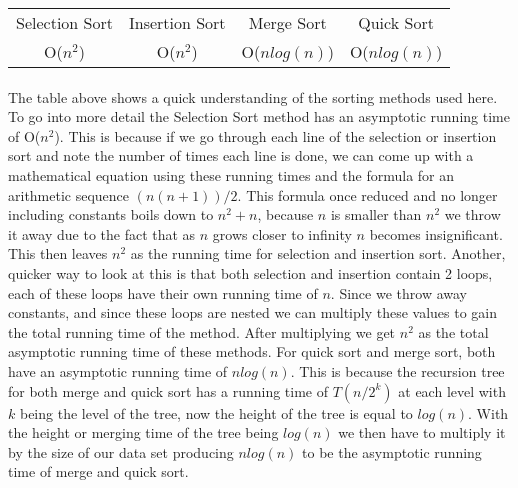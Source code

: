 \documentclass[letterpaper, 10pt,DIV=13]{scrartcl}
\numberwithin{equation}{section} %
\numberwithin{figure}{section} %
\numberwithin{table}{section} %
\begin{document}
\begin{center}
\begin{tabular}{ |c|c|c|c| } 
 \hline
 Selection Sort & Insertion Sort & Merge Sort & Quick Sort \\ 
 O($n^2$) & O($n^2$) & O($nlog(n)$) & O($nlog(n)$)\\ 
 \hline
\end{tabular}
\end{center}

\paragraph{} The table above shows a quick understanding of the sorting methods used here. To go into more detail the Selection Sort method has an asymptotic running time of O($n^2$). This is because if we go through each line of the selection or insertion sort and note the number of times each line is done, we can come up with a mathematical equation using these running times and the formula for an arithmetic sequence $(n(n+1))/2$. This formula once reduced and no longer including constants boils down to $n^2 + n$, because $n$ is smaller than $n^2$ we throw it away due to the fact that as $n$ grows closer to infinity $n$ becomes insignificant. This then leaves $n^2$ as the running time for selection and insertion sort. Another, quicker way to look at this is that both selection and insertion contain 2 loops, each of these loops have their own running time of $n$. Since we throw away constants, and since these loops are nested we can multiply these values to gain the total running time of the method. After multiplying we get $n^2$ as the total asymptotic running time of these methods. For quick sort and merge sort, both have an asymptotic running time of $nlog(n)$. This is because the recursion tree for both merge and quick sort has a running time of $T(n/2^k)$ at each level with $k$ being the level of the tree, now the height of the tree is equal to $log(n)$. With the height or merging time of the tree being $log(n)$ we then have to multiply it by the size of our data set producing $nlog(n)$ to be the asymptotic running time of merge and quick sort.




 

\pagebreak
\end{document}
